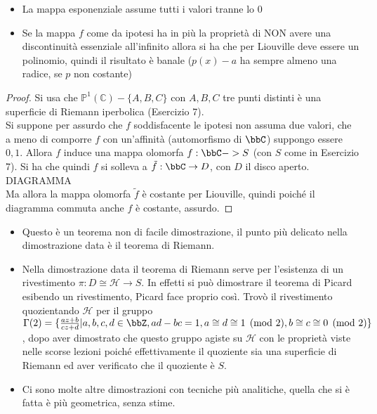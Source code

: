 \begin{osservazione}
\begin{itemize}
\item La mappa esponenziale assume tutti i valori tranne lo $0$
\item Se la mappa $f$ come da ipotesi ha in più la proprietà di NON avere una discontinuità essenziale all'infinito allora si ha che per Liouville deve essere un polinomio, quindi il risultato è banale ($p(x)-a$ ha sempre almeno una radice, se $p$ non costante)
\end{itemize}
\end{osservazione}


\begin{proof}
Si usa che $\mathbb{P}^1(\mathbb{C})\minus\{ A, B, C\}$ con $A, B, C$ tre punti distinti è una superficie di Riemann iperbolica (Esercizio 7).\\
Si suppone per assurdo che $f$ soddisfacente le ipotesi non assuma due valori, che a meno di comporre $f$ con un'affinità (automorfismo di $\bbC$) suppongo essere $0,1$.
Allora $f$ induce una mappa olomorfa $f:\bbC->S$ (con $S$ come in Esercizio 7).
Si ha che quindi $f$ si solleva a $\tilde{f}:\bbC\rightarrow D$, con $D$ il disco aperto. DIAGRAMMA \\
Ma allora la mappa olomorfa $\tilde{f}$ è costante per Liouville, quindi poiché il diagramma commuta anche $f$ è costante, assurdo.
\end{proof}

\begin{osservazione}
\begin{itemize}
\item Questo è un teorema non di facile dimostrazione, il punto più delicato nella dimostrazione data è il teorema di Riemann.
\item Nella dimostrazione data il teorema di Riemann serve per l'esistenza di un rivestimento $\pi:D\cong \mathcal{H} \rightarrow S$. In effetti si può dimostrare il teorema di Picard esibendo un rivestimento, Picard face proprio così. Trovò il rivestimento quozientando $\mathcal{H}$ per il gruppo $\Gamma(2)=\{ \frac{az+b}{cz+d} | a,b,c,d\in \bbZ, ad-bc=1, a\cong d \cong 1 \pmod{2}, b\cong c \cong 0 \pmod{2} \}$, dopo aver dimostrato che questo gruppo agiste su $\mathcal{H}$ con le proprietà viste nelle scorse lezioni poiché effettivamente il quoziente sia una superficie di Riemann ed aver verificato che il quoziente è $S$.
\item Ci sono molte altre dimostrazioni con tecniche più analitiche, quella che si è fatta è più geometrica, senza stime. 
\end{itemize}
\end{osservazione}

